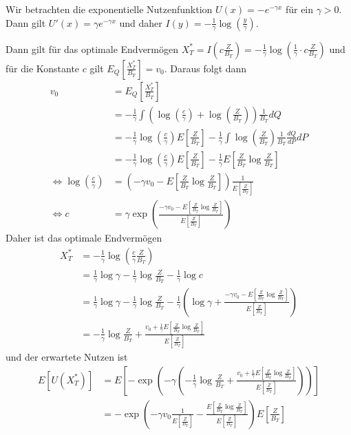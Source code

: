 \documentclass[a4paper,twoside,DIV15,BCOR12mm]{scrbook}
\begin{document}
\begin{beispiel}
\label{bsp:3.3.2}
Wir betrachten die exponentielle Nutzenfunktion $U(x) = -e^{-\gamma x}$ für ein $\gamma >0$. Dann gilt $U'(x) = \gamma e^{-\gamma x}$ und daher $I(y) = -\frac1\gamma \log(\frac y \gamma)$.

Dann gilt für das optimale Endvermögen $X_T^* = I(c \frac{Z}{B_T}) = -\frac{1}{\gamma}\log(\frac1\gamma \cdot c \frac{Z}{B_T})$ und für die Konstante $c$ gilt $E_Q[\frac{X_T^*}{B_T}] = v_0$.
Daraus folgt dann
\begin{align*}
v_0 &= E_Q[\frac{X_T^*}{B_T}]  \\
&= - \frac1\gamma \int (\log(\frac c \gamma) + \log (\frac{Z}{B_T})) \frac1{B_T} dQ \\
&= - \frac1\gamma \log(\frac c \gamma)E[\frac{Z}{B_T}] - \frac1\gamma \int \log( \frac{Z}{B_T}) \frac1{B_T} \frac{dQ}{dP} dP \\
&= - \frac1\gamma \log(\frac c \gamma)E[\frac{Z}{B_T}] - \frac1\gamma E[\frac{Z}{B_T} \log \frac{Z}{B_T}] \\
\iff \log(\frac c\gamma) &= (-\gamma v_0 - E[\frac{Z}{B_T} \log \frac{Z}{B_T}]) \frac{1}{E[\frac{Z}{B_T}]} \\
\iff c &= \gamma \exp\left( \frac{-\gamma v_0 - E[\frac{Z}{B_T} \log \frac{Z}{B_T}]}{E[\frac{Z}{B_T}]} \right)
\end{align*}
Daher ist das optimale Endvermögen
\begin{align*}
X_T^*& = -\frac{1}\gamma \log (\frac c\gamma \frac{Z}{B_T}) \\
&= \frac{1}\gamma \log \gamma - \frac1\gamma \log  \frac{Z}{B_T} - \frac1\gamma \log c \\
&= \frac{1}\gamma \log \gamma - \frac1\gamma \log  \frac{Z}{B_T} - \frac1\gamma \left (\log \gamma + \frac{-\gamma v_0 - E[\frac{Z}{B_T} \log \frac{Z}{B_T}]}{E[\frac{Z}{B_T}]}\right) \\
&= - \frac1\gamma \log  \frac{Z}{B_T} +  \frac{v_0 + \frac1\gamma E[\frac{Z}{B_T} \log \frac{Z}{B_T}]}{E[\frac{Z}{B_T}]}
\end{align*}
und der erwartete Nutzen ist
\begin{align*}
E[U(X_T^*)] &= E[-\exp(-\gamma (- \frac1\gamma \log  \frac{Z}{B_T} +  \frac{v_0 + \frac1\gamma E[\frac{Z}{B_T} \log \frac{Z}{B_T}]}{E[\frac{Z}{B_T}]}))] \\
&= -\exp\left( -\gamma v_0 \frac1{E[\frac{Z}{B_T}]} - \frac{E[\frac{Z}{B_T} \log \frac{Z}{B_T}]}{E[\frac{Z}{B_T}]} \right) E[\frac{Z}{B_T}]
\end{align*}
\end{beispiel}
\end{document}
